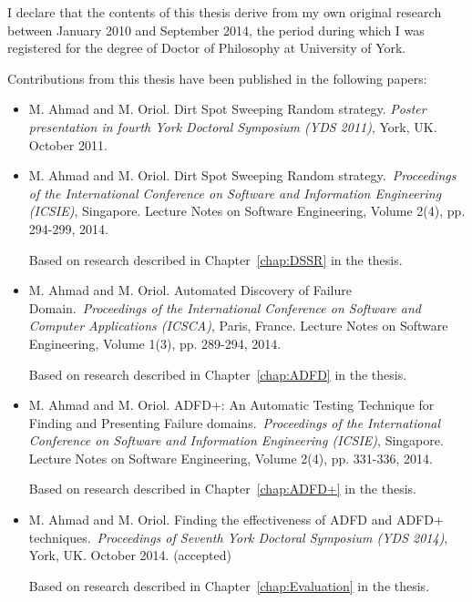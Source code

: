 \begin{declaration}

I declare that the contents of this thesis derive from my own original research between January 2010 and September 2014, the period during which I was registered for the degree of Doctor of Philosophy at University of York.

Contributions from this thesis have been published in the following papers: 

\begin{itemize}

\item M. Ahmad and M. Oriol. Dirt Spot Sweeping Random strategy. \textit{Poster presentation in fourth York Doctoral Symposium (YDS 2011)}, York, UK. October 2011.

\item M. Ahmad and M. Oriol. Dirt Spot Sweeping Random strategy.~\textit{Proceedings of the International Conference on Software and Information Engineering (ICSIE)}, Singapore. Lecture Notes on Software Engineering, Volume 2(4), pp. 294-299, 2014.

Based on research described in Chapter~\ref{chap:DSSR} in the thesis.\\

\item M. Ahmad and M. Oriol. Automated Discovery of Failure Domain.~\textit{Proceedings of the International Conference on Software and Computer Applications (ICSCA)}, Paris, France. Lecture Notes on Software Engineering, Volume 1(3), pp. 289-294, 2014.

Based on research described in Chapter~\ref{chap:ADFD} in the thesis.\\

\item M. Ahmad and M. Oriol. ADFD+: An Automatic Testing Technique for Finding and Presenting Failure domains.~\textit{Proceedings of the International Conference on Software and Information Engineering (ICSIE)}, Singapore. Lecture Notes on Software Engineering, Volume 2(4), pp. 331-336, 2014.

Based on research described in Chapter~\ref{chap:ADFD+} in the thesis.\\

\item M. Ahmad and M. Oriol. Finding the effectiveness of ADFD and ADFD+ techniques.~\textit{Proceedings of Seventh York Doctoral Symposium (YDS 2014)}, York, UK. October 2014. (accepted)

Based on research described in Chapter~\ref{chap:Evaluation} in the thesis.

\end{itemize}

\end{declaration}